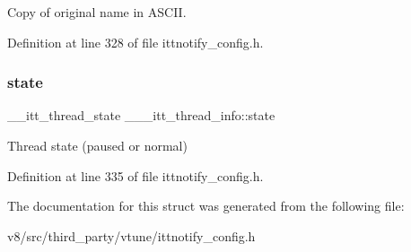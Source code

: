 Copy of original name in A\+S\+C\+II. 

Definition at line 328 of file ittnotify\+\_\+config.\+h.

\mbox{\label{struct______itt__thread__info_a6f6f3ed5a462461cc8dc05b650e331ba}} 
\subsubsection{\texorpdfstring{state}{state}}
{\footnotesize\ttfamily \+\_\+\+\_\+itt\+\_\+thread\+\_\+state \+\_\+\+\_\+\+\_\+itt\+\_\+thread\+\_\+info\+::state}

Thread state (paused or normal) 

Definition at line 335 of file ittnotify\+\_\+config.\+h.



The documentation for this struct was generated from the following file\+:\begin{DoxyCompactItemize}
\item 
v8/src/third\+\_\+party/vtune/ittnotify\+\_\+config.\+h\end{DoxyCompactItemize}
